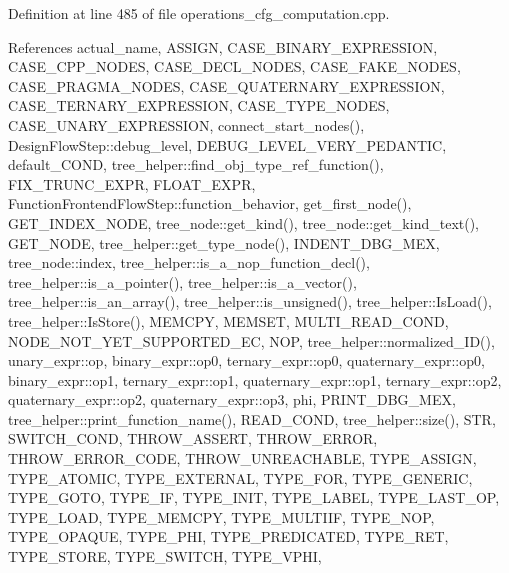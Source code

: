 Definition at line 485 of file operations\+\_\+cfg\+\_\+computation.\+cpp.



References actual\+\_\+name, A\+S\+S\+I\+GN, C\+A\+S\+E\+\_\+\+B\+I\+N\+A\+R\+Y\+\_\+\+E\+X\+P\+R\+E\+S\+S\+I\+ON, C\+A\+S\+E\+\_\+\+C\+P\+P\+\_\+\+N\+O\+D\+ES, C\+A\+S\+E\+\_\+\+D\+E\+C\+L\+\_\+\+N\+O\+D\+ES, C\+A\+S\+E\+\_\+\+F\+A\+K\+E\+\_\+\+N\+O\+D\+ES, C\+A\+S\+E\+\_\+\+P\+R\+A\+G\+M\+A\+\_\+\+N\+O\+D\+ES, C\+A\+S\+E\+\_\+\+Q\+U\+A\+T\+E\+R\+N\+A\+R\+Y\+\_\+\+E\+X\+P\+R\+E\+S\+S\+I\+ON, C\+A\+S\+E\+\_\+\+T\+E\+R\+N\+A\+R\+Y\+\_\+\+E\+X\+P\+R\+E\+S\+S\+I\+ON, C\+A\+S\+E\+\_\+\+T\+Y\+P\+E\+\_\+\+N\+O\+D\+ES, C\+A\+S\+E\+\_\+\+U\+N\+A\+R\+Y\+\_\+\+E\+X\+P\+R\+E\+S\+S\+I\+ON, connect\+\_\+start\+\_\+nodes(), Design\+Flow\+Step\+::debug\+\_\+level, D\+E\+B\+U\+G\+\_\+\+L\+E\+V\+E\+L\+\_\+\+V\+E\+R\+Y\+\_\+\+P\+E\+D\+A\+N\+T\+IC, default\+\_\+\+C\+O\+ND, tree\+\_\+helper\+::find\+\_\+obj\+\_\+type\+\_\+ref\+\_\+function(), F\+I\+X\+\_\+\+T\+R\+U\+N\+C\+\_\+\+E\+X\+PR, F\+L\+O\+A\+T\+\_\+\+E\+X\+PR, Function\+Frontend\+Flow\+Step\+::function\+\_\+behavior, get\+\_\+first\+\_\+node(), G\+E\+T\+\_\+\+I\+N\+D\+E\+X\+\_\+\+N\+O\+DE, tree\+\_\+node\+::get\+\_\+kind(), tree\+\_\+node\+::get\+\_\+kind\+\_\+text(), G\+E\+T\+\_\+\+N\+O\+DE, tree\+\_\+helper\+::get\+\_\+type\+\_\+node(), I\+N\+D\+E\+N\+T\+\_\+\+D\+B\+G\+\_\+\+M\+EX, tree\+\_\+node\+::index, tree\+\_\+helper\+::is\+\_\+a\+\_\+nop\+\_\+function\+\_\+decl(), tree\+\_\+helper\+::is\+\_\+a\+\_\+pointer(), tree\+\_\+helper\+::is\+\_\+a\+\_\+vector(), tree\+\_\+helper\+::is\+\_\+an\+\_\+array(), tree\+\_\+helper\+::is\+\_\+unsigned(), tree\+\_\+helper\+::\+Is\+Load(), tree\+\_\+helper\+::\+Is\+Store(), M\+E\+M\+C\+PY, M\+E\+M\+S\+ET, M\+U\+L\+T\+I\+\_\+\+R\+E\+A\+D\+\_\+\+C\+O\+ND, N\+O\+D\+E\+\_\+\+N\+O\+T\+\_\+\+Y\+E\+T\+\_\+\+S\+U\+P\+P\+O\+R\+T\+E\+D\+\_\+\+EC, N\+OP, tree\+\_\+helper\+::normalized\+\_\+\+I\+D(), unary\+\_\+expr\+::op, binary\+\_\+expr\+::op0, ternary\+\_\+expr\+::op0, quaternary\+\_\+expr\+::op0, binary\+\_\+expr\+::op1, ternary\+\_\+expr\+::op1, quaternary\+\_\+expr\+::op1, ternary\+\_\+expr\+::op2, quaternary\+\_\+expr\+::op2, quaternary\+\_\+expr\+::op3, phi, P\+R\+I\+N\+T\+\_\+\+D\+B\+G\+\_\+\+M\+EX, tree\+\_\+helper\+::print\+\_\+function\+\_\+name(), R\+E\+A\+D\+\_\+\+C\+O\+ND, tree\+\_\+helper\+::size(), S\+TR, S\+W\+I\+T\+C\+H\+\_\+\+C\+O\+ND, T\+H\+R\+O\+W\+\_\+\+A\+S\+S\+E\+RT, T\+H\+R\+O\+W\+\_\+\+E\+R\+R\+OR, T\+H\+R\+O\+W\+\_\+\+E\+R\+R\+O\+R\+\_\+\+C\+O\+DE, T\+H\+R\+O\+W\+\_\+\+U\+N\+R\+E\+A\+C\+H\+A\+B\+LE, T\+Y\+P\+E\+\_\+\+A\+S\+S\+I\+GN, T\+Y\+P\+E\+\_\+\+A\+T\+O\+M\+IC, T\+Y\+P\+E\+\_\+\+E\+X\+T\+E\+R\+N\+AL, T\+Y\+P\+E\+\_\+\+F\+OR, T\+Y\+P\+E\+\_\+\+G\+E\+N\+E\+R\+IC, T\+Y\+P\+E\+\_\+\+G\+O\+TO, T\+Y\+P\+E\+\_\+\+IF, T\+Y\+P\+E\+\_\+\+I\+N\+IT, T\+Y\+P\+E\+\_\+\+L\+A\+B\+EL, T\+Y\+P\+E\+\_\+\+L\+A\+S\+T\+\_\+\+OP, T\+Y\+P\+E\+\_\+\+L\+O\+AD, T\+Y\+P\+E\+\_\+\+M\+E\+M\+C\+PY, T\+Y\+P\+E\+\_\+\+M\+U\+L\+T\+I\+IF, T\+Y\+P\+E\+\_\+\+N\+OP, T\+Y\+P\+E\+\_\+\+O\+P\+A\+Q\+UE, T\+Y\+P\+E\+\_\+\+P\+HI, T\+Y\+P\+E\+\_\+\+P\+R\+E\+D\+I\+C\+A\+T\+ED, T\+Y\+P\+E\+\_\+\+R\+ET, T\+Y\+P\+E\+\_\+\+S\+T\+O\+RE, T\+Y\+P\+E\+\_\+\+S\+W\+I\+T\+CH, T\+Y\+P\+E\+\_\+\+V\+P\+HI, 